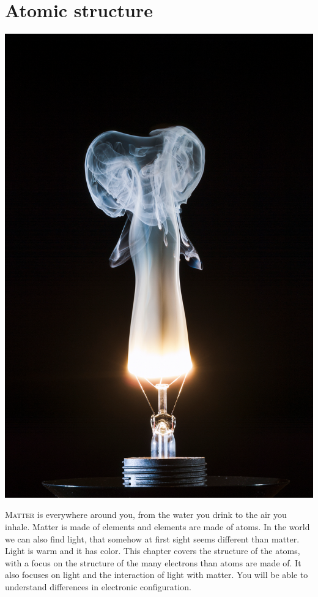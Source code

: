 \documentclass[main.tex]{subfiles}
\begin{document}
\linenumbers

  

\chapter[Atomic structure]{Atomic structure}

\begin{marginfigure}
      \includegraphics{chapter3/figure1}
      \label{fig:marginfig1}
   \end{marginfigure}
\lettrine[lines=4]{\color{black!45}M}{atter} is everywhere around you, from the water you drink to the air you inhale. Matter is made of elements and elements are made of atoms. In the world we can also find light, that somehow at first sight seems different than matter. Light is warm and it has color. This chapter covers the structure of the atoms, with a focus on the structure of the many electrons than atoms are made of. It also focuses on light and the interaction of light with matter. You will be able to understand differences in electronic configuration.
 
\end{document}
